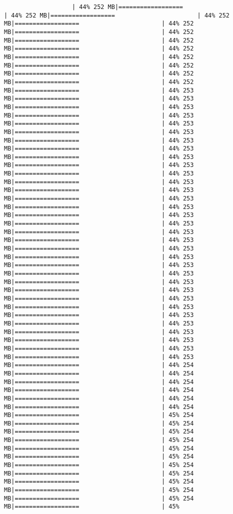 \documentclass[
]{article}
\begin{document}
\begin{verbatim}
                   | 44% 252 MB|==================                       | 44% 252 MB|==================                       | 44% 252 MB|==================                       | 44% 252 MB|==================                       | 44% 252 MB|==================                       | 44% 252 MB|==================                       | 44% 252 MB|==================                       | 44% 252 MB|==================                       | 44% 252 MB|==================                       | 44% 252 MB|==================                       | 44% 252 MB|==================                       | 44% 253 MB|==================                       | 44% 253 MB|==================                       | 44% 253 MB|==================                       | 44% 253 MB|==================                       | 44% 253 MB|==================                       | 44% 253 MB|==================                       | 44% 253 MB|==================                       | 44% 253 MB|==================                       | 44% 253 MB|==================                       | 44% 253 MB|==================                       | 44% 253 MB|==================                       | 44% 253 MB|==================                       | 44% 253 MB|==================                       | 44% 253 MB|==================                       | 44% 253 MB|==================                       | 44% 253 MB|==================                       | 44% 253 MB|==================                       | 44% 253 MB|==================                       | 44% 253 MB|==================                       | 44% 253 MB|==================                       | 44% 253 MB|==================                       | 44% 253 MB|==================                       | 44% 253 MB|==================                       | 44% 253 MB|==================                       | 44% 253 MB|==================                       | 44% 253 MB|==================                       | 44% 253 MB|==================                       | 44% 253 MB|==================                       | 44% 253 MB|==================                       | 44% 253 MB|==================                       | 44% 253 MB|==================                       | 44% 253 MB|==================                       | 44% 253 MB|==================                       | 44% 254 MB|==================                       | 44% 254 MB|==================                       | 44% 254 MB|==================                       | 44% 254 MB|==================                       | 44% 254 MB|==================                       | 44% 254 MB|==================                       | 45% 254 MB|==================                       | 45% 254 MB|==================                       | 45% 254 MB|==================                       | 45% 254 MB|==================                       | 45% 254 MB|==================                       | 45% 254 MB|==================                       | 45% 254 MB|==================                       | 45% 254 MB|==================                       | 45% 254 MB|==================                       | 45% 254 MB|==================                       | 45% 254 MB|==================                       | 45% 
\end{verbatim}
\end{document}
